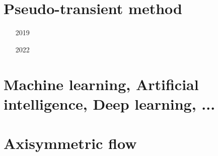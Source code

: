 

\section{Pseudo-transient method}

\begin{scriptsize}
\begin{itemize}
\item[2019] 
\item[2022] 
\end{itemize}
\end{scriptsize}

\section{Machine learning, Artificial intelligence, Deep learning, ...}

\begin{scriptsize}
\begin{itemize}
\item[\twothousandtwentyone] 
\item[\twothousandtwentythree] 
\end{itemize}
\end{scriptsize}

\section{Axisymmetric flow}

